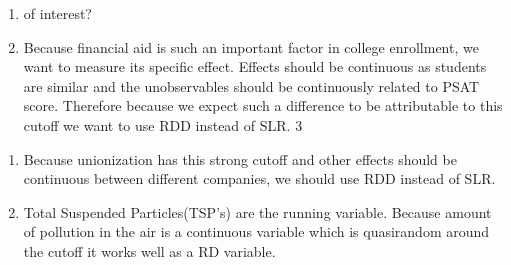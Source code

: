 \documentclass[
  12pt,
  landscape]{article}
\providecommand{\tightlist}{%
  \setlength{\itemsep}{0pt}\setlength{\parskip}{0pt}}
\begin{document}
\begin{enumerate}
\def\labelenumi{\alph{enumi})}
\setcounter{enumi}{18}
\tightlist
\item
  of interest?
\item
  Because financial aid is such an important factor in college
  enrollment, we want to measure its specific effect. Effects should be
  continuous as students are similar and the unobservables should be
  continuously related to PSAT score. Therefore because we expect such a
  difference to be attributable to this cutoff we want to use RDD
  instead of SLR. 3
\end{enumerate}

\begin{enumerate}
\def\labelenumi{\roman{enumi})}
\setcounter{enumi}{1}
\tightlist
\item
  Because unionization has this strong cutoff and other effects should
  be continuous between different companies, we should use RDD instead
  of SLR.
\item
  Total Suspended Particles(TSP's) are the running variable. Because
  amount of pollution in the air is a continuous variable which is
  quasirandom around the cutoff it works well as a RD variable.
\end{enumerate}
\end{document}
